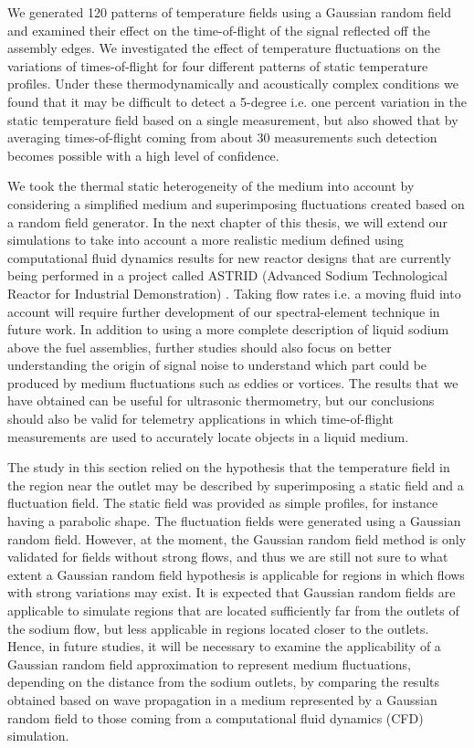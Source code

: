 We generated 120 patterns of temperature fields using a Gaussian random field and examined their effect on the time-of-flight of the signal reflected
off the assembly edges. We investigated the effect of temperature fluctuations on the variations of times-of-flight for four different patterns of static
temperature profiles. Under these thermodynamically and acoustically complex conditions we found that it may be difficult to detect a \num{5}-degree i.e. one
percent variation in the static temperature field based on a single measurement, but also showed that by averaging times-of-flight coming from about \num{30}
measurements such detection becomes possible with a high level of confidence.

We took the thermal static heterogeneity of the medium into account by considering a simplified medium and superimposing fluctuations created
based on a random field generator. In the next chapter of this thesis, we will extend our simulations to take into account a more realistic medium defined
using computational fluid dynamics results for new reactor designs that are currently
being performed in a project called ASTRID (Advanced Sodium Technological Reactor for Industrial Demonstration) \parencite{Coz2011Sodiumcooledfast}.
Taking flow rates i.e. a moving fluid into account will require further development of our spectral-element technique in future work. In addition to using a more complete
description of liquid sodium above the fuel assemblies, further studies should also focus on better understanding the origin of signal noise to understand
which part could be produced by medium fluctuations such as eddies or vortices. The results that we have obtained can be useful for ultrasonic thermometry, but
our conclusions should also be valid for telemetry applications in which time-of-flight measurements are used to accurately locate objects in a liquid medium.

The study in this section relied on the hypothesis that the temperature field in the region near the outlet may be described by superimposing a static
field and a fluctuation field. The static field was provided as simple profiles, for instance having a parabolic shape. The fluctuation fields were generated
using a Gaussian random field.
However, at the moment, the Gaussian random field method is only validated for fields without strong flows,
and thus we are still not sure to what extent a Gaussian random field hypothesis is applicable for regions in which flows with strong variations may exist.
It is expected that Gaussian random fields are applicable to simulate regions that are located sufficiently far from the outlets of the sodium flow,
but less applicable in regions located closer to the outlets. Hence, in future studies, it will be necessary to examine the applicability of a Gaussian random field
approximation to represent medium fluctuations, depending on the distance from the sodium outlets, by comparing the results obtained based on wave propagation in a medium
represented by a Gaussian random field to those coming from a computational fluid dynamics (CFD) simulation.

